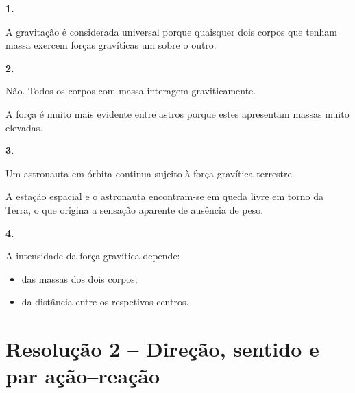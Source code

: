 \documentclass[11pt,a4paper]{article}
\begin{document}
	\begin{solucaobox}[Questões 1--4]
		
		\textbf{1.}
		
		A gravitação é considerada universal porque quaisquer dois corpos que
		tenham massa exercem forças gravíticas um sobre o outro.
		
		\vspace{2mm}
		
		\textbf{2.}
		
		Não. Todos os corpos com massa interagem graviticamente.
		
		A força é muito mais evidente entre astros porque estes apresentam massas
		muito elevadas.
		
		\vspace{2mm}
		
		\textbf{3.}
		
		Um astronauta em órbita continua sujeito à força gravítica terrestre.
		
		A estação espacial e o astronauta encontram-se em queda livre em torno da
		Terra, o que origina a sensação aparente de ausência de peso.
		
		\vspace{2mm}
		
		\textbf{4.}
		
		A intensidade da força gravítica depende:
		
		\begin{itemize}
			
			\item das massas dos dois corpos;
			
			\item da distância entre os respetivos centros.
			
		\end{itemize}
		
	\end{solucaobox}
	
	\section*{Resolução 2 -- Direção, sentido e par ação--reação}
	
\end{document}
